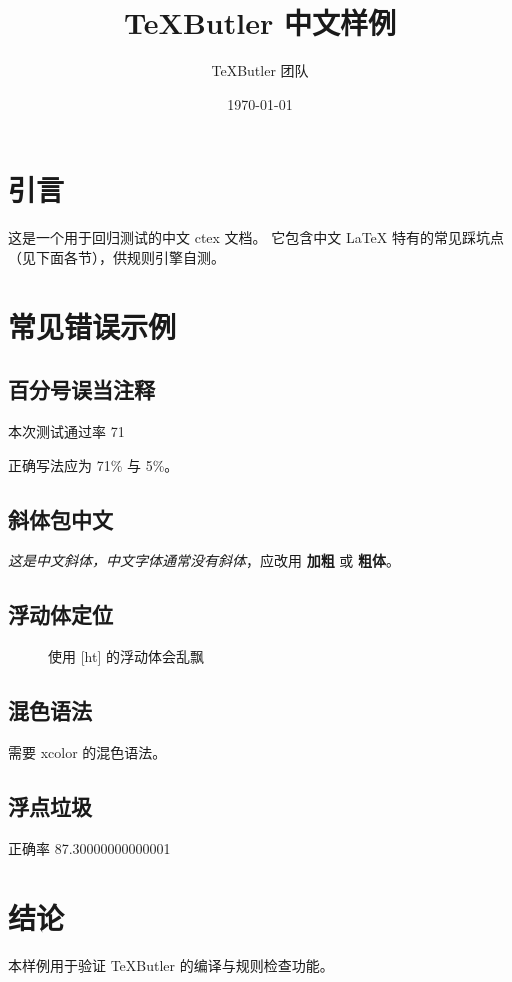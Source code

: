 \documentclass[UTF8]{ctexart}
\title{TeXButler 中文样例}
\author{TeXButler 团队}
\date{\today}
\begin{document}
\maketitle

\section{引言}

这是一个用于回归测试的中文 ctex 文档。
它包含中文 LaTeX 特有的常见踩坑点（见下面各节），供规则引擎自测。

\section{常见错误示例}

\subsection{百分号误当注释}

本次测试通过率 71%

正确写法应为 71\% 与 5\%。

\subsection{斜体包中文}

\textit{这是中文斜体，中文字体通常没有斜体}，应改用 \textbf{加粗} 或 {\bfseries 粗体}。

\subsection{浮动体定位}

\begin{figure}[ht]
\centering
\caption{使用 [ht] 的浮动体会乱飘}
\end{figure}

\begin{table}[H]
\centering
\caption{使用 [H] 的浮动体固定在本位}
\end{table}

\subsection{混色语法}

{\color{red!60} 需要 xcolor 的混色语法}。

\subsection{浮点垃圾}

正确率 87.30000000000001%

\section{结论}

本样例用于验证 TeXButler 的编译与规则检查功能。
\end{document}
